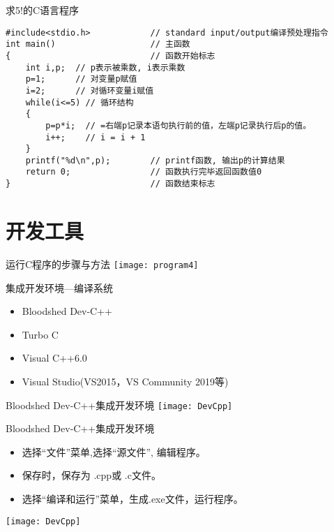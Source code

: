 \begin{frame}[fragile]{求5!的C语言程序}
\begin{lstlisting}
#include<stdio.h>            // standard input/output编译预处理指令
int main()                   // 主函数
{                            // 函数开始标志
	int i,p;  // p表示被乘数, i表示乘数
	p=1;	  // 对变量p赋值
	i=2;      // 对循环变量i赋值
	while(i<=5) // 循环结构
	{  
		p=p*i;  // =右端p记录本语句执行前的值，左端p记录执行后p的值。
		i++;    // i = i + 1
	}
	printf("%d\n",p);        // printf函数, 输出p的计算结果
	return 0;                // 函数执行完毕返回函数值0
}                            // 函数结束标志
\end{lstlisting}
\end{frame}

\section{开发工具}

\begin{frame}{运行C程序的步骤与方法}
\centering
\texttt{[image: program4]}
\end{frame}

\begin{frame}{集成开发环境---编译系统}
\begin{itemize}
\setlength{\itemsep}{.5cm}
\item Bloodshed Dev-C++ 
\item Turbo C
\item Visual C++6.0 
\item Visual Studio(VS2015，VS Community 2019等)
\end{itemize}
\end{frame}

\begin{frame}{Bloodshed Dev-C++集成开发环境}
\texttt{[image: DevCpp]}   
\end{frame}

\begin{frame}{Bloodshed Dev-C++集成开发环境}
\vspace{-0.3cm}
\begin{itemize}
\item 选择“文件”菜单,选择“源文件”, 编辑程序。
\item 保存时，保存为 .cpp或 .c文件。
\item 选择“编译和运行”菜单，生成.exe文件，运行程序。  
\end{itemize}
\centering 
\texttt{[image: DevCpp]}   
\end{frame}
